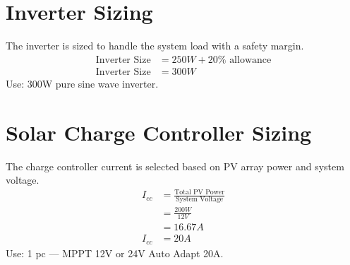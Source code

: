 \section*{Inverter Sizing}
The inverter is sized to handle the system load with a safety margin.  
\begin{align*}
	\text{Inverter Size} &= 250W + 20\% \text{ allowance} \\
	\text{Inverter Size} &= 300W
\end{align*}
Use: 300W pure sine wave inverter.

\section*{Solar Charge Controller Sizing}
The charge controller current is selected based on PV array power and system voltage.  
\begin{align*}
	I_{cc} &= \frac{\text{Total PV Power}}{\text{System Voltage}} \\
	&= \frac{200W}{12V} \\
	&= 16.67A \\
	I_{cc} &= 20A
\end{align*}
Use: 1 pc — MPPT 12V or 24V Auto Adapt 20A.

